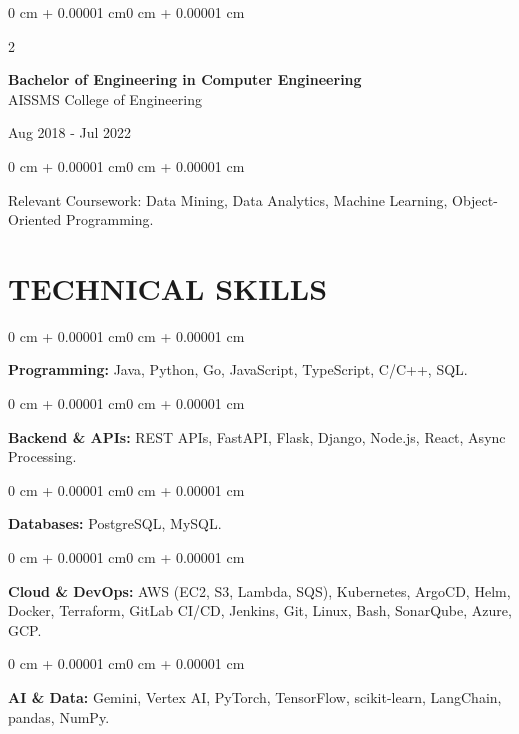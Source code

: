 \documentclass[10pt, letterpaper]{article}
\newenvironment{onecolentry}{
    \begin{adjustwidth}{0 cm + 0.00001 cm}{0 cm + 0.00001 cm}
}{
    \end{adjustwidth}
}
\newenvironment{twocolentry}[2][]{
    \onecolentry
    \def\secondColumn{#2}
    \setcolumnwidth{\fill, 4.5 cm}
    \begin{paracol}{2}
}{
    \switchcolumn \raggedleft \secondColumn
    \end{paracol}
    \endonecolentry
}
\begin{document}
\begin{twocolentry}{
    Aug 2018 - Jul 2022
}
    \textbf{Bachelor of Engineering in Computer Engineering} \\
    AISSMS College of Engineering
\end{twocolentry}
\begin{onecolentry}
Relevant Coursework: Data Mining, Data Analytics, Machine Learning, Object-Oriented Programming.
\end{onecolentry}
\section{TECHNICAL SKILLS}
\begin{onecolentry}
\textbf{Programming:} Java, Python, Go, JavaScript, TypeScript, C/C++, SQL.
\end{onecolentry}
\vspace{0.06 cm}
\begin{onecolentry}
\textbf{Backend \& APIs:} REST APIs, FastAPI, Flask, Django, Node.js, React, Async Processing.
\end{onecolentry}
\vspace{0.06 cm}
\begin{onecolentry}
\textbf{Databases:} PostgreSQL, MySQL.
\end{onecolentry}
\vspace{0.06 cm}
\begin{onecolentry}
\textbf{Cloud \& DevOps:} AWS (EC2, S3, Lambda, SQS), Kubernetes, ArgoCD, Helm, Docker, Terraform, GitLab CI/CD, Jenkins, Git, Linux, Bash, SonarQube, Azure, GCP.
\end{onecolentry}
\vspace{0.06 cm}
\begin{onecolentry}
\textbf{AI \& Data:} Gemini, Vertex AI, PyTorch, TensorFlow, scikit-learn, LangChain, pandas, NumPy.
\end{onecolentry}

\end{document}
